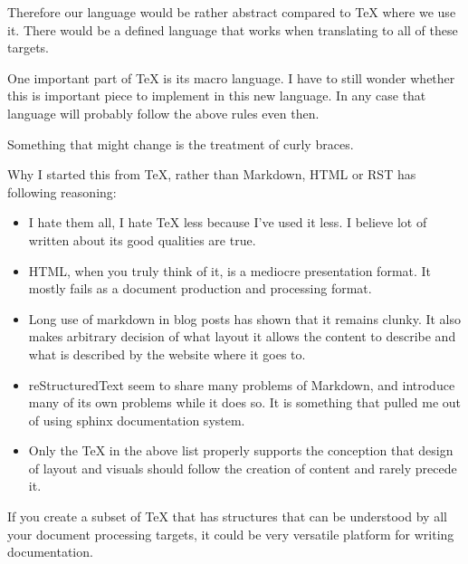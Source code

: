 \documentclass{article}
\begin{document}
Therefore our language would be rather abstract compared to
TeX where we use it. There would be a defined language that
works when translating to all of these targets.

One important part of TeX is its macro language. I have to
still wonder whether this is important piece to implement in
this new language. In any case that language will probably
follow the above rules even then.

Something that might change is the treatment of curly braces.


Why I started this from TeX, rather than Markdown, HTML or
RST has following reasoning:

\begin{itemize}
    \item
        I hate them all, I hate TeX less because I've used
        it less. I believe lot of written about its good
        qualities are true.
    \item
        HTML, when you truly think of it, is a mediocre
        presentation format. It mostly fails as a
        document production and processing format.
    \item
        Long use of markdown in blog posts has shown that it
        remains clunky. It also makes arbitrary decision of
        what layout it allows the content to describe and
        what is described by the website where it goes to.
    \item
        reStructuredText seem to share many problems of
        Markdown, and introduce many of its own problems
        while it does so. It is something that pulled me out
        of using sphinx documentation system.
    \item
        Only the TeX in the above list properly supports the
        conception that design of layout and visuals should
        follow the creation of content and rarely precede it.
\end{itemize}

If you create a subset of TeX that has structures that can
be understood by all your document processing targets, it
could be very versatile platform for writing documentation.
\end{document}
